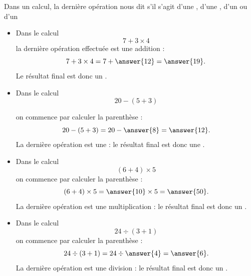 \begin{propbox}
    Dans un calcul, la dernière opération nous dit s'il s'agit d'une ,
    d'une , d'un  ou d'un 
\end{propbox}

\begin{exemplebox}
    \begin{itemize}[label=\textbullet]
    \item Dans le calcul  
    \[
        7+3\times4
    \]
    la dernière opération effectuée est une addition :
    \[
        7+3\times4
        =7+\answer{12}
        =\answer{19}.
    \]
    Le résultat final est donc un .
    
    \item Dans le calcul $$20-(5+3)$$

    on commence par calculer la parenthèse :
    \[
        20-(5+3)
        =20-\answer{8}
        =\answer{12}.
    \]
    La dernière opération est une  : le résultat final est donc une
    .

    \item Dans le calcul $$(6+4)\times5$$
    on commence par calculer la parenthèse :
    \[
        (6+4)\times5
        =\answer{10}\times5
        =\answer{50}.
    \]
    La dernière opération est une multiplication : le résultat final est donc un
    .

    \item Dans le calcul $$ 24\div(3+1) $$
    on commence par calculer la parenthèse :
    \[
        24\div(3+1)
        =24\div\answer{4}
        =\answer{6}.
    \]
    La dernière opération est une division : le résultat final est donc un
    .
\end{itemize}

\end{exemplebox}


